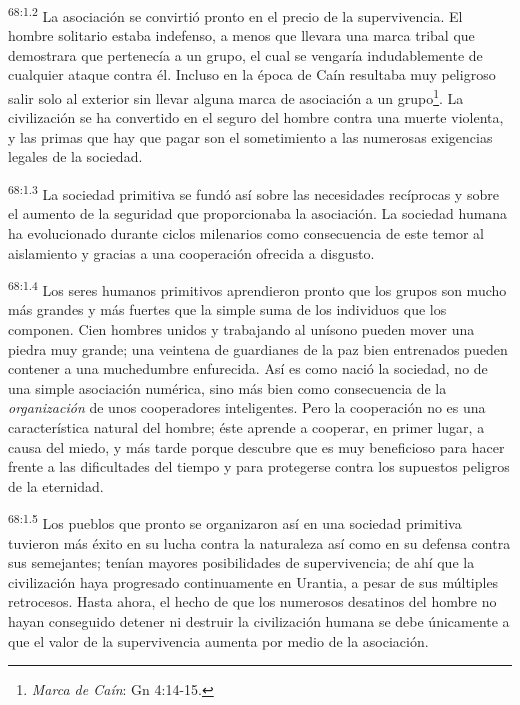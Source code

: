 \documentclass[twoside, 11pt]{book}
\begin{document}
\par
\textsuperscript{68:1.2} La asociación se convirtió pronto en el precio de la supervivencia. El hombre solitario estaba indefenso, a menos que llevara una marca tribal que demostrara que pertenecía a un grupo, el cual se vengaría indudablemente de cualquier ataque contra él. Incluso en la época de Caín resultaba muy peligroso salir solo al exterior sin llevar alguna marca de asociación a un grupo\footnote{\textit{Marca de Caín}: Gn 4:14-15.}. La civilización se ha convertido en el seguro del hombre contra una muerte violenta, y las primas que hay que pagar son el sometimiento a las numerosas exigencias legales de la sociedad.

\par
\textsuperscript{68:1.3} La sociedad primitiva se fundó así sobre las necesidades recíprocas y sobre el aumento de la seguridad que proporcionaba la asociación. La sociedad humana ha evolucionado durante ciclos milenarios como consecuencia de este temor al aislamiento y gracias a una cooperación ofrecida a disgusto.

\par
\textsuperscript{68:1.4} Los seres humanos primitivos aprendieron pronto que los grupos son mucho más grandes y más fuertes que la simple suma de los individuos que los componen. Cien hombres unidos y trabajando al unísono pueden mover una piedra muy grande; una veintena de guardianes de la paz bien entrenados pueden contener a una muchedumbre enfurecida. Así es como nació la sociedad, no de una simple asociación numérica, sino más bien como consecuencia de la \textit{organización} de unos cooperadores inteligentes. Pero la cooperación no es una característica natural del hombre; éste aprende a cooperar, en primer lugar, a causa del miedo, y más tarde porque descubre que es muy beneficioso para hacer frente a las dificultades del tiempo y para protegerse contra los supuestos peligros de la eternidad.

\par
\textsuperscript{68:1.5} Los pueblos que pronto se organizaron así en una sociedad primitiva tuvieron más éxito en su lucha contra la naturaleza así como en su defensa contra sus semejantes; tenían mayores posibilidades de supervivencia; de ahí que la civilización haya progresado continuamente en Urantia, a pesar de sus múltiples retrocesos. Hasta ahora, el hecho de que los numerosos desatinos del hombre no hayan conseguido detener ni destruir la civilización humana se debe únicamente a que el valor de la supervivencia aumenta por medio de la asociación.
\end{document}
